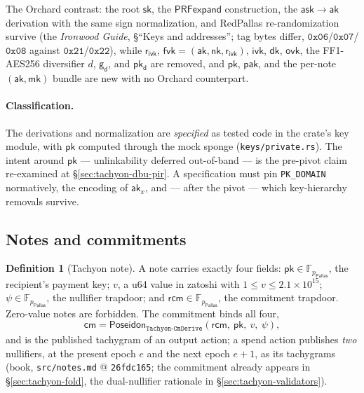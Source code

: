\documentclass[11pt,a4paper]{article}
\theoremstyle{definition}
\newtheorem{definition}[theorem]{Definition}
\newcommand{\F}{\mathbb{F}}
\newcommand{\cmsym}{\mathsf{cm}}
\newcommand{\Pallas}{\ensuremath{\mathsf{Pallas}}}
\newcommand{\ask}{\ensuremath{\mathsf{ask}}}
\newcommand{\aksym}{\ensuremath{\mathsf{ak}}}
\newcommand{\nksym}{\ensuremath{\mathsf{nk}}}
\newcommand{\ivk}{\ensuremath{\mathsf{ivk}}}
\newcommand{\fvk}{\ensuremath{\mathsf{fvk}}}
\newcommand{\ovk}{\ensuremath{\mathsf{ovk}}}
\newcommand{\dk}{\ensuremath{\mathsf{dk}}}
\newcommand{\pkd}{\ensuremath{\mathsf{pk_d}}}
\newcommand{\gd}{\ensuremath{\mathsf{g_d}}}
\newcommand{\rcm}{\ensuremath{\mathsf{rcm}}}
\newcommand{\rivk}{\ensuremath{\mathsf{r_{ivk}}}}
\begin{document}
The Orchard contrast: the root $\mathsf{sk}$, the $\mathsf{PRFexpand}$
construction, the $\ask \to \aksym$ derivation with the same sign
normalization, and RedPallas re-randomization survive (the \emph{Ironwood
Guide}, \S``Keys and addresses''; tag bytes
differ, $\mathtt{0x06}$/$\mathtt{0x07}$/$\mathtt{0x08}$ against
$\mathtt{0x21}$/$\mathtt{0x22}$), while $\rivk$, $\fvk = (\aksym, \nksym,
\rivk)$, $\ivk$, $\dk$, $\ovk$, the FF1-AES256 diversifier $d$, $\gd$, and
$\pkd$ are removed, and $\mathsf{pk}$, $\mathsf{pak}$, and the per-note
$(\aksym, \mathsf{mk})$ bundle are new with no Orchard counterpart.

\paragraph{Classification.} The derivations and normalization are
\emph{specified} as tested code in the crate's key module, with
$\mathsf{pk}$ computed through the mock sponge
(\texttt{keys/private.rs}). The intent around $\mathsf{pk}$ ---
unlinkability deferred out-of-band --- is the pre-pivot claim re-examined
at \S\ref{sec:tachyon-dbu-pir}. A specification must pin
\texttt{PK\_DOMAIN} normatively, the encoding of $\aksym_x$, and --- after
the pivot --- which key-hierarchy removals survive.

\subsection{Notes and commitments}\label{sec:tachyon-design-notes}

\begin{definition}[Tachyon note]\label{def:tachyon-design-note}
A note carries exactly four fields: $\mathsf{pk} \in \F_{p_{\Pallas}}$, the
recipient's payment key; $v$, a u64 value in zatoshi with
$1 \leq v \leq 2.1 \times 10^{15}$; $\psi \in \F_{p_{\Pallas}}$, the
nullifier trapdoor; and $\rcm \in \F_{p_{\Pallas}}$, the commitment
trapdoor. Zero-value notes are forbidden. The commitment binds all four,
\[
\cmsym = \mathsf{Poseidon}_{\texttt{Tachyon-CmDerive}}
  (\rcm,\ \mathsf{pk},\ v,\ \psi),
\]
and is the published tachygram of an output action; a spend action
publishes \emph{two} nullifiers, at the present epoch $e$ and the next
epoch $e+1$, as its tachygrams (book, \texttt{src/notes.md} @
\texttt{26fdc165}; the commitment already appears in
\S\ref{sec:tachyon-fold}, the dual-nullifier rationale in
\S\ref{sec:tachyon-validators}).
\end{definition}
\end{document}
